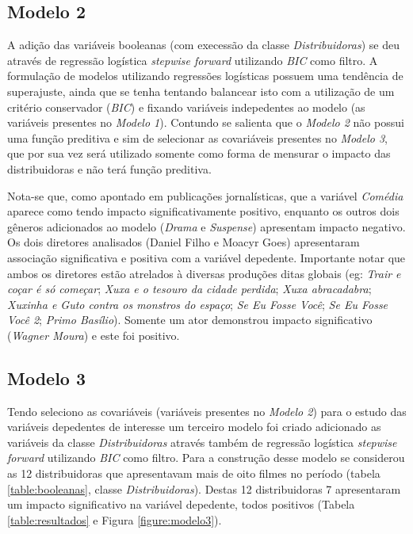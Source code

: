 \documentclass[11pt,a4paper]{article}
\begin{document}
\subsection{Modelo 2}
A adição das variáveis booleanas (com execessão da classe \textit{Distribuidoras}) se deu através de regressão logística \textit{stepwise forward} utilizando \textit{BIC} como filtro. A formulação de modelos utilizando regressões logísticas possuem uma tendência de superajuste, ainda que se tenha tentando balancear isto com a utilização de um critério conservador (\textit{BIC}) e fixando variáveis indepedentes ao modelo (as variáveis presentes no \textit{Modelo 1}). Contundo se salienta que o \textit{Modelo 2} não possui uma função preditiva e sim de selecionar as covariáveis presentes no \textit{Modelo 3}, que por sua vez será utilizado somente como forma de mensurar o impacto das distribuidoras e não terá função preditiva. 

Nota-se que, como apontado em publicações jornalísticas, que a variável \textit{Comédia} aparece como tendo impacto significativamente positivo, enquanto os outros dois gêneros adicionados ao modelo (\textit{Drama} e \textit{Suspense}) apresentam impacto negativo. Os dois diretores analisados (Daniel Filho e Moacyr Goes) apresentaram associação significativa e positiva com a variável depedente. Importante notar que ambos os diretores estão atrelados à diversas produções ditas globais (eg: \textit{ Trair e coçar é só começar}; \textit{Xuxa e o tesouro da cidade perdida}; \textit{Xuxa abracadabra}; \textit{Xuxinha e Guto contra os monstros do espaço}; \textit{Se Eu Fosse Você}; \textit{Se Eu Fosse Você 2}; \textit{Primo Basílio}). Somente um ator demonstrou impacto significativo (\textit{Wagner Moura}) e este foi positivo.


\subsection{Modelo 3}

Tendo seleciono as covariáveis (variáveis presentes no \textit{Modelo 2}) para o estudo das variáveis depedentes de interesse um terceiro modelo foi criado adicionado as variáveis da classe \textit{Distribuidoras} através também de regressão logística \textit{stepwise forward} utilizando \textit{BIC} como filtro. Para a construção desse modelo se considerou as 12 distribuidoras que apresentavam mais de oito filmes no período (tabela \ref{table:booleanas}, classe \textit{Distribuidoras}). Destas 12 distribuidoras 7 apresentaram um impacto significativo na variável depedente, todos positivos (Tabela \ref{table:resultados} e Figura \ref{figure:modelo3}). 
\end{document}
